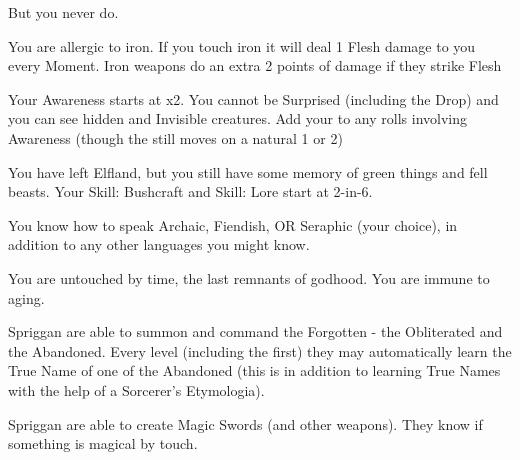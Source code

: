 {  But you never do.   



  You are allergic to iron.  If you touch iron it will deal 1 Flesh damage to you every Moment.  Iron weapons do an extra 2 points of damage if they strike Flesh

  Your Awareness starts at \DCUP x2. You cannot be Surprised (including the Drop) and you can see hidden and Invisible creatures.  Add your \LVL to any rolls involving Awareness (though the \UD still moves \DCDOWN on a natural 1 or 2)

  You have left Elfland, but you still have some memory of green things and fell beasts.  Your Skill: Bushcraft and Skill: Lore start at 2-in-6.

  You know how to speak Archaic, Fiendish, OR Seraphic (your choice), in addition to any other languages you might know.


  You are untouched by time, the last remnants of godhood.  You are immune to aging.

  Spriggan are able to summon and command the Forgotten - the Obliterated and the Abandoned.  Every level (including the first) they may automatically learn the True Name of one of the Abandoned (this is in addition to learning True Names with the help of a Sorcerer's Etymologia). 

  Spriggan are able to create Magic Swords (and other weapons).  They know if something is magical by touch.

}
